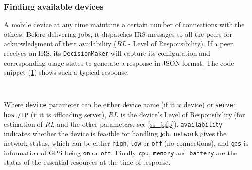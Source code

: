 \documentclass{sig-alternate}[10pt]
\begin{document}
\begin{CCSXML}
\subsubsection{Finding available devices}\label{ss_dfp}

A mobile device at any time maintains a certain number of connections with the others. Before delivering jobs, it dispatches IRS messages to all the peers for acknowledgment of their availability ($RL$ - Level of Responsibility). If a peer receives an IRS, its \texttt{DecisionMaker} will capture its configuration and corresponding usage states to generate a response in JSON format, The code snippet (\ref{code:jsonResponse}) shows such a typical response.\\

\begin{figure}
\noindent {}	\\
\noindent {}	

\label{code:jsonResponse}

\end{figure}

Where \texttt{device} parameter can be either device name (if it is device) or \texttt{server host/IP} (if it is offloading server), $RL$ is the device's Level of Responsibility (for estimation of $RL$ and the other parameters, see \ref{ss_jqfp}), \texttt{availability} indicates whether the device is feasible for handling job. \texttt{network} gives the network status, which can be either \texttt{high}, \texttt{low} or \texttt{off} (no connections), and \texttt{gps} is information of GPS being \texttt{on} or \texttt{off}. Finally \texttt{cpu}, \texttt{memory} and \texttt{battery} are the status of the essential resources at the time of response. 


\end{CCSXML}
\end{document}
